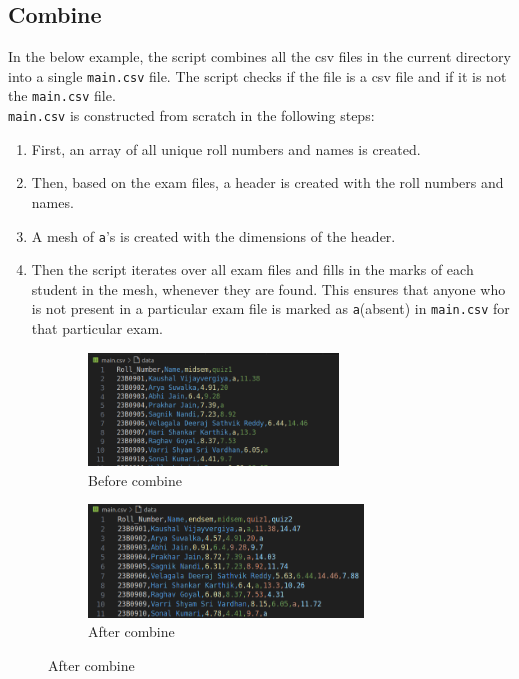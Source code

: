 \documentclass{article}
\begin{document}
\subsection{Combine}
In the below example, the script combines all the csv files in the current directory into a single \verb"main.csv" file. The script checks if the file is a csv file and if it is not the \verb"main.csv" file.\\ \verb"main.csv" is constructed from scratch in the following steps:
\begin{enumerate}
    \item First, an array of all unique roll numbers and names is created.
    \item Then, based on the exam files, a header is created with the roll numbers and names.
    \item A mesh of \verb"a"'s is created with the dimensions of the header.
    \item Then the script iterates over all exam files and fills in the marks of each student in the mesh, whenever they are found. This ensures that anyone who is not present in a particular exam file is marked as \verb"a"(absent) in \verb"main.csv" for that particular exam.
\end{enumerate}
\begin{figure}[h]
    \begin{subfigure}{0.5\textwidth}
    \includegraphics[width=\linewidth, height=3cm]{before_combine.png} 
    \caption{Before combine}
    \label{fig:subim1}
    \end{subfigure}
    \begin{subfigure}{0.5\textwidth}
    \includegraphics[width=\linewidth, height=3cm]{after_combine.png}
    \caption{After combine}
    \label{fig:subim2}
    \end{subfigure}
\end{figure}
\end{document}
